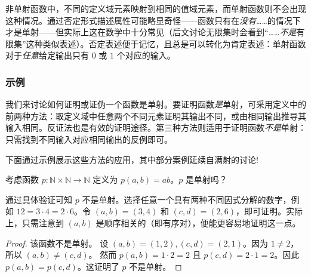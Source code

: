 \begin{multicols}{2}
\begin{center}
    \end{center}
\end{multicols}

非单射函数中，不同的定义域元素映射到相同的值域元素，而单射函数则不会出现这种情况。通过否定形式描述属性可能略显奇怪——函数只有在\emph{没有}……的情况下才是单射——但实际上这在数学中十分常见（后文讨论无限集时会看到``……\emph{不是}有限集''这种类似表述）。否定表述便于记忆，且总是可以转化为肯定表述：单射函数对于\emph{任意}给定输出只有 $0$ 或 $1$ 个对应的输入。

\subsubsection*{示例}

我们来讨论如何证明或证伪一个函数是单射。要证明函数\emph{是}单射，可采用定义中的前两种方法：取定义域中任意两个不同元素证明其输出不同，或由相同输出推导其输入相同。反证法也是有效的证明途径。第三种方法则适用于证明函数\emph{不是}单射：只需找到不同输入对应相同输出的反例即可。

下面通过示例展示这些方法的应用，其中部分案例延续自满射的讨论!

\begin{example}
    考虑函数 $p : \mathbb{N} \times \mathbb{N} \to \mathbb{N}$ 定义为 $p(a,b) = ab$。$p$ 是单射吗？

    通过具体验证可知 $p$ 不是单射。选择任意一个具有两种不同因式分解的数字，例如 $12 = 3 \cdot 4 = 2 \cdot 6$。令 $(a, b) = (3, 4)$ 和 $(c, d) = (2, 6)$，即可证明。实际上，只需注意到 $(a, b)$ 是顺序相关的（即有序对），便能更容易地证明这一点。

    \begin{proof}
        该函数不是单射。
        设 $ (a, b) = (1, 2), (c, d) = (2, 1)$。因为 $1 \ne 2$，所以 $ (a, b) \ne (c, d)$。
        然而 $p(a, b) = 1 \cdot 2 = 2$ 且 $p(c, d) = 2 \cdot 1 = 2$。因此 $p(a, b) = p(c, d)$。这证明了 $p$ 不是单射。
    \end{proof}
\end{example}

